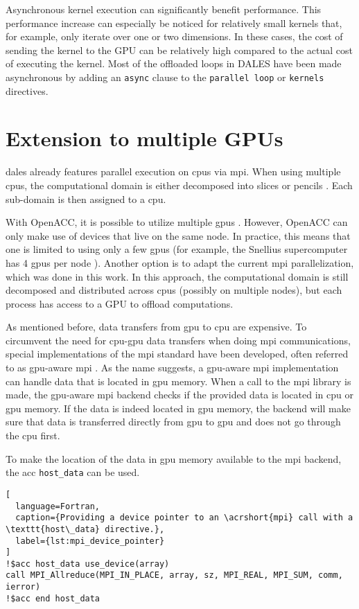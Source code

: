 Asynchronous kernel execution can significantly benefit performance. This performance increase can especially be noticed for relatively small kernels that, for example, only iterate over one or two dimensions. In these cases, the cost of sending the kernel to the GPU can be relatively high compared to the actual cost of executing the kernel. Most of the offloaded loops in DALES have been made asynchronous by adding an \texttt{async} clause to the \texttt{parallel loop} or \texttt{kernels} directives. 

\section{Extension to multiple GPUs}
\acrshort{dales} already features parallel execution on \acrshort{cpu}s via \acrfull{mpi}. When using multiple \acrshort{cpu}s, the computational domain is either decomposed into slices or pencils . Each sub-domain is then assigned to a \acrshort{cpu}. 

With OpenACC, it is possible to utilize multiple \acrshort{gpu}s \citep{farberParallelProgrammingOpenACC2017}. However, OpenACC can only make use of devices that live on the same node. In practice, this means that one is limited to using only a few \acrshort{gpu}s (for example, the Snellius supercomputer has 4 \acrshort{gpu}s per node \citep{surfSnelliusHardwareFile}). Another option is to adapt the current \acrshort{mpi} parallelization, which was done in this work. In this approach, the computational domain is still decomposed and distributed across \acrshort{cpu}s (possibly on multiple nodes), but each process has access to a GPU to offload computations. 

As mentioned before, data transfers from \acrshort{gpu} to \acrshort{cpu} are expensive. To circumvent the need for \acrshort{cpu}-\acrshort{gpu} data transfers when doing \acrshort{mpi} communications, special implementations of the \acrshort{mpi} standard have been developed, often referred to as \acrshort{gpu}-aware \acrshort{mpi} \citep{potluriEfficientInternodeMPI2013}. As the name suggests, a \acrshort{gpu}-aware \acrshort{mpi} implementation can handle data that is located in \acrshort{gpu} memory. When a call to the \acrshort{mpi} library is made, the \acrshort{gpu}-aware \acrshort{mpi} backend checks if the provided data is located in \acrshort{cpu} or \acrshort{gpu} memory. If the data is indeed located in \acrshort{gpu} memory, the backend will make sure that data is transferred directly from \acrshort{gpu} to \acrshort{gpu} and does not go through the \acrshort{cpu} first. 

To make the location of the data in \acrshort{gpu} memory available to the \acrshort{mpi} backend, the \acrshort{acc} \texttt{host\_data} can be used. 

\begin{lstlisting}[
  language=Fortran,
  caption={Providing a device pointer to an \acrshort{mpi} call with a \texttt{host\_data} directive.},
  label={lst:mpi_device_pointer}
]
!$acc host_data use_device(array)
call MPI_Allreduce(MPI_IN_PLACE, array, sz, MPI_REAL, MPI_SUM, comm, ierror)
!$acc end host_data
\end{lstlisting}
